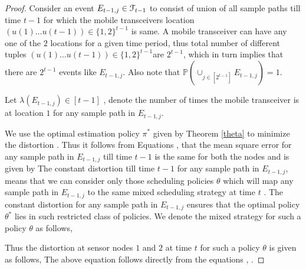 \documentclass[a4paper,english,12pt]{article}
\begin{document}
\begin{proof}
Consider an event $E_{t-1,j}\in \mathcal{F}_{t-1} $ to consist of union of all sample paths till time $t-1$ for which the mobile transceivers location $(u(1)\dots u(t-1)) \in \{1,2\}^{t-1}$ is same. A mobile transceiver can have any one of the $2$ locations for a given time period, thus total number of different tuples $(u(1)\dots u(t-1)) \in \{1,2\}^{t-1}$are $2^{t-1}$, which in turn implies that there are $2^{t-1}$ events like $E_{t-1,j}$. Also note that  $\mathbb{P}(\cup_{j \in [2^{t-1}]}E_{t-1,j})=1$.

Let $\lambda(E_{t-1,j}) \in   [t-1]$ , denote the number of times the mobile transceiver is at location $1$ for any sample path in $E_{t-1,j}$.

 We use the optimal estimation policy $\pi^*$ given by Theorem \ref{theta} to minimize the distortion . Thus it follows from Equations ,  that the mean square error for any sample path in $E_{t-1,j}$ till time $t-1$  is the same for both the nodes and is given by  The constant distortion till time $t-1$ for any sample path in $E_{t-1,j}$, means that we can consider only those scheduling policies $\theta$ which will map any sample path in $E_{t-1,j}$ to the same mixed scheduling strategy  at time $t$ . The constant distortion for any sample path in $E_{t-1,j}$ ensures that the optimal policy $\theta^*$ lies in such restricted class of policies. We denote the mixed strategy for such a policy $\theta$ as follows,
    
    Thus the distortion at sensor nodes $1$ and $2$ at time $t$ for such a policy $\theta$  is given as follows,
    The above equation follows directly from the equations  , .
    

\end{proof}
\end{document}
